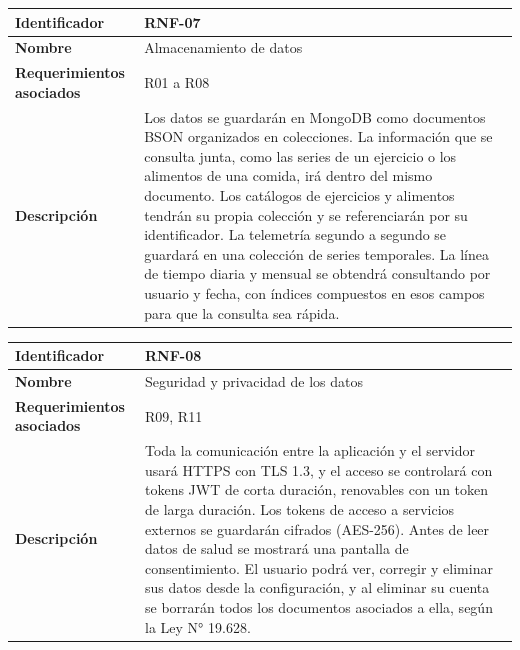 \begin{table}[h!]
    \centering
    \renewcommand{\arraystretch}{1.3}
    \begin{tabular}{|p{3.5cm}|p{11.5cm}|}
        \hline
        \rowcolor[HTML]{EFEFEF}
        \textbf{Identificador} & \textbf{RNF-07} \\ \hline
        \textbf{Nombre} & Almacenamiento de datos \\ \hline
        \textbf{Requerimientos asociados} & R01 a R08 \\ \hline
        \textbf{Descripción} & Los datos se guardarán en MongoDB como documentos BSON organizados en colecciones. La información que se consulta junta, como las series de un ejercicio o los alimentos de una comida, irá dentro del mismo documento. Los catálogos de ejercicios y alimentos tendrán su propia colección y se referenciarán por su identificador. La telemetría segundo a segundo se guardará en una colección de series temporales. La línea de tiempo diaria y mensual se obtendrá consultando por usuario y fecha, con índices compuestos en esos campos para que la consulta sea rápida. \\ \hline
    \end{tabular}
\end{table}
\newpage
\begin{table}[h!]
    \centering
    \renewcommand{\arraystretch}{1.3}
    \begin{tabular}{|p{3.5cm}|p{11.5cm}|}
        \hline
        \rowcolor[HTML]{EFEFEF}
        \textbf{Identificador} & \textbf{RNF-08} \\ \hline
        \textbf{Nombre} & Seguridad y privacidad de los datos \\ \hline
        \textbf{Requerimientos asociados} & R09, R11 \\ \hline
        \textbf{Descripción} & Toda la comunicación entre la aplicación y el servidor usará HTTPS con TLS 1.3, y el acceso se controlará con tokens JWT de corta duración, renovables con un token de larga duración. Los tokens de acceso a servicios externos se guardarán cifrados (AES-256). Antes de leer datos de salud se mostrará una pantalla de consentimiento. El usuario podrá ver, corregir y eliminar sus datos desde la configuración, y al eliminar su cuenta se borrarán todos los documentos asociados a ella, según la Ley N° 19.628. \\ \hline
    \end{tabular}
\end{table}
